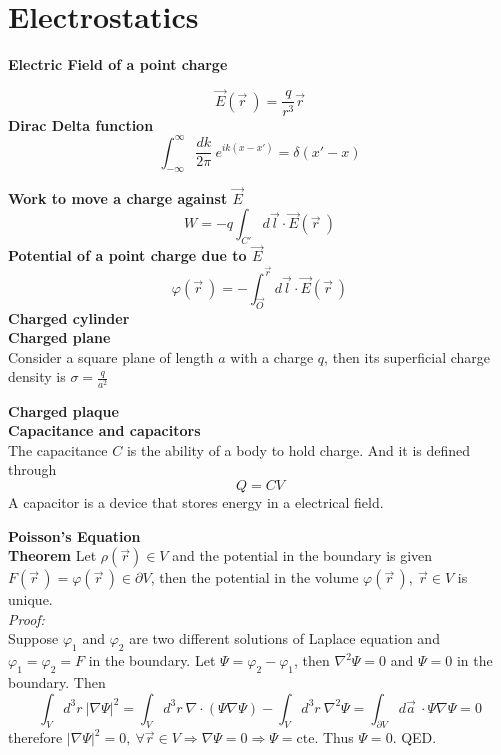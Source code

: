 \documentclass[12pt,a4paper]{article}
\newcommand{\integral}[3]{\int_{#1}^{#2} d #3 \ } %
\begin{document}
\section{Electrostatics}
\textbf{Electric Field of a point charge}

\begin{equation}
	\vec{E}(\vec{r}\ ) = \frac{q}{r^3}\vec{r}
\end{equation}
\textbf{Dirac Delta function}\\
\begin{equation}
	\int_{-\infty}^{\infty} \frac{dk}{2\pi} \ e^{ik(x-x')} = \delta (x'-x)
\end{equation}

\textbf{Work to move a charge against $\vec{E}$}\\
\begin{equation}
	W = -q \int_{C'}d\vec{l} \cdot\vec{E}(\vec{r}\ )
\end{equation}
\textbf{Potential of a point charge due to $\vec{E}$}\\
\begin{equation}
	\varphi (\vec{r}\ ) = - \int_{\vec{O}}^{\vec{r}} d\vec{l} \cdot\vec{E}(\vec{r}\ )
\end{equation}
\textbf{Charged cylinder}\\

\textbf{Charged plane}\\
Consider a square plane of length $a$ with a charge $q$, then its superficial charge density is $\sigma = \frac{q}{a^2}$

\textbf{Charged plaque}\\

\textbf{Capacitance and capacitors}\\
The capacitance $C$ is the ability of a body to hold charge. And it is defined through
\begin{equation}
	Q= CV
\end{equation}
A capacitor is a device that stores energy in a electrical field.

\textbf{Poisson's Equation}\\

\textbf{Theorem} Let $\rho(\vec{r}) \in V$ and the potential in the boundary is given $F(\vec{r}\,)=\varphi(\vec{r} \,) \in \partial V$, then the potential in the volume $\varphi(\vec{r}\,), \  \vec{r} \in  V$ is unique. \\
\textit{Proof: }\\
Suppose $\varphi_1$ and $\varphi_2$ are two different solutions of Laplace equation and $\varphi_1 = \varphi_2 = F$ in the boundary. Let $\Psi = \varphi_2-\varphi_1$, then $\nabla^2 \Psi = 0$  and  $\Psi = 0$ in the boundary. Then
\begin{equation}
	\integral{V}{}{^3r} |\nabla \Psi|^2 = \integral{V}{}{^3r} \nabla\cdot (\Psi \nabla \Psi)- \integral{V}{}{^3r} \nabla^2 \Psi = \integral{\partial V}{}{ \vec{a}} \cdot \Psi\nabla \Psi = 0
\end{equation}
therefore $|\nabla \Psi|^2 = 0, \  \forall \vec{r} \in V  \Rightarrow \nabla \Psi = 0 \Rightarrow \Psi = \text{cte.}$  Thus $\Psi = 0$. QED.
\end{document}

